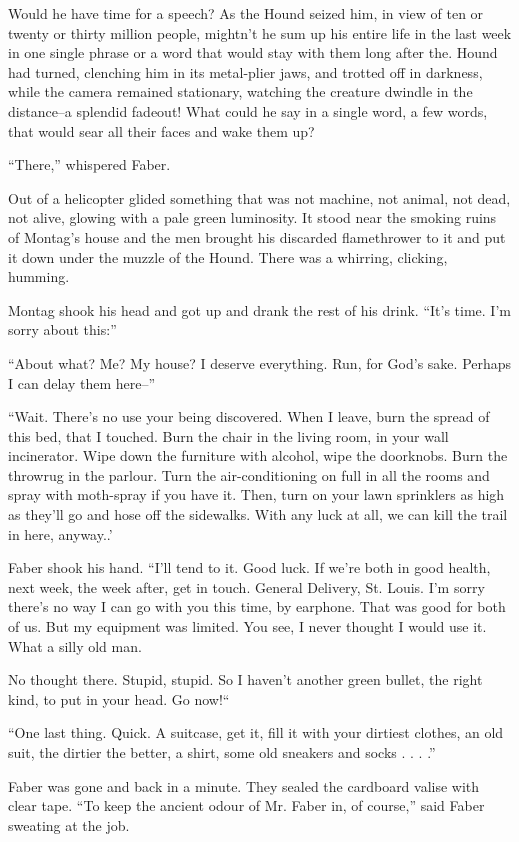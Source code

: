 \documentclass[11pt,openany]{book}
\begin{document}
Would he have time for a speech? As the Hound seized him, in view of ten or twenty or thirty million people, mightn't he sum up his entire life in the last week in one single phrase or a word that would stay with them long after the. Hound had turned, clenching him in its metal-plier jaws, and trotted off in darkness, while the camera remained stationary, watching the creature dwindle in the distance--a splendid fadeout! What could he say in a single word, a few words, that would sear all their faces and wake them up?

``There,'' whispered Faber.

Out of a helicopter glided something that was not machine, not animal, not dead, not alive, glowing with a pale green luminosity. It stood near the smoking ruins of Montag's house and the men brought his discarded flamethrower to it and put it down under the muzzle of the Hound. There was a whirring, clicking, humming.

Montag shook his head and got up and drank the rest of his drink. ``It's time. I'm sorry about this:''

``About what? Me? My house? I deserve everything. Run, for God's sake. Perhaps I can delay them here--''

``Wait. There's no use your being discovered. When I leave, burn the spread of this bed, that I touched. Burn the chair in the living room, in your wall incinerator. Wipe down the furniture with alcohol, wipe the doorknobs. Burn the throwrug in the parlour. Turn the air-conditioning on full in all the rooms and spray with moth-spray if you have it. Then, turn on your lawn sprinklers as high as they'll go and hose off the sidewalks. With any luck at all, we can kill the trail in here, anyway..'

Faber shook his hand. ``I'll tend to it. Good luck. If we're both in good health, next week, the week after, get in touch. General Delivery, St. Louis. I'm sorry there's no way I can go with you this time, by earphone. That was good for both of us. But my equipment was limited. You see, I never thought I would use it. What a silly old man.

No thought there. Stupid, stupid. So I haven't another green bullet, the right kind, to put in your head. Go now!``

``One last thing. Quick. A suitcase, get it, fill it with your dirtiest clothes, an old suit, the dirtier the better, a shirt, some old sneakers and socks . . . .''

Faber was gone and back in a minute. They sealed the cardboard valise with clear tape. ``To keep the ancient odour of Mr. Faber in, of course,'' said Faber sweating at the job.
\end{document}

